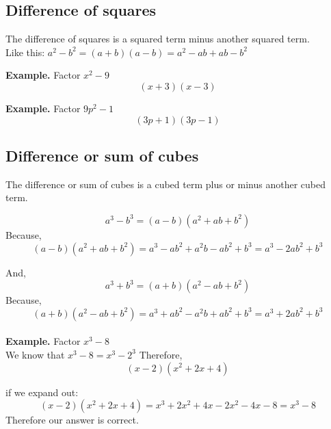 \subsection{Difference of squares}
The difference of squares is a squared term minus another squared term.
\\ Like this: $a^2 - b^2 = (a+b)(a-b) = a^2-ab+ab-b^2 $ 

\textbf{Example.} Factor $x^2 - 9$ 
$$ (x+3)(x-3) $$


\textbf{Example.} Factor $9p^2 - 1$ 
$$ (3p+1)(3p-1) $$

\subsection{Difference or sum of cubes}
The difference or sum of cubes is a cubed term plus or minus another cubed term.

$$ a^3 - b^3 = (a-b)(a^2+ab+b^2) $$ Because, $$(a-b)(a^2+ab+b^2) = a^3 - ab^2 + a^2b - ab^2 + b^3 = a^3 - 2ab^2 + b^3 $$ 

And, 
$$ a^3 + b^3 = (a+b)(a^2-ab+b^2) $$ Because, $$(a+b)(a^2-ab+b^2) = a^3 + ab^2 - a^2b + ab^2 + b^3 = a^3 + 2ab^2 + b^3 $$ 
\\
\textbf{Example.} Factor $x^3 - 8$ \\
We know that $x^3 - 8 = x^3 - 2^3$
Therefore,
$$ (x-2)(x^2+2x+4) $$

if we expand out: 
$$ (x-2)(x^2+2x+4) = x^3 + 2x^2 + 4x - 2x^2 - 4x - 8 = x^3 - 8 $$
Therefore our answer is correct.